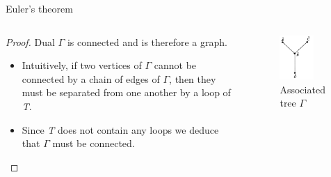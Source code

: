 \documentclass{beamer}
\begin{document}
\begin{frame}{Euler's theorem}
  \begin{columns}
    \begin{column}{0.6\textwidth}
      \begin{proof}
        Dual $\Gamma$ is connected and is therefore a graph.
        \begin{itemize}
        \item Intuitively, if two vertices of $\Gamma$ cannot be connected by a chain of edges of $\Gamma$, then they must be separated from one another by a loop of \textsl{T}.
        \item Since \textsl{T} does not contain any loops we deduce that $\Gamma$ must be connected.
        \end{itemize}
      \end{proof}
    \end{column}
    \begin{column}{0.4\textwidth}
      \begin{figure}
        \centering
        \includegraphics[width=0.7\textwidth]{figure_1_5_b.png}
        \caption{Associated tree $\Gamma$}
      \end{figure}
    \end{column}
  \end{columns}
\end{frame}
\end{document}
